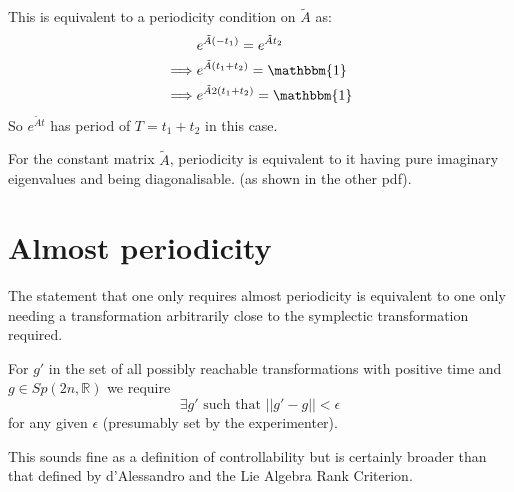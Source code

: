 This is equivalent to a periodicity condition on $\tilde{A}$ as:
\begin{equation}
\begin{aligned}
&e^{\tilde{A}(-t_1)} = e^{\tilde{A}t_2} \\
\implies &e^{\tilde{A}(t_1+t_2)} = \mathbbm{1} \\
\implies &e^{\tilde{A}2(t_1+t_2)} = \mathbbm{1}
\end{aligned}
\end{equation}
So $e^{\tilde{A}t}$ has period of $T = t_1 + t_2$ in this case.

For the constant matrix $\tilde{A}$, periodicity is equivalent to it having pure imaginary eigenvalues and being diagonalisable. (as shown in the other pdf).

\section{Almost periodicity}
The statement that one only requires almost periodicity is equivalent to one only needing a transformation arbitrarily close to the symplectic transformation required.

For $g'$ in the set of all possibly reachable transformations with positive time and $g \in Sp(2n,\mathbb{R})$ we require
\begin{equation}
\exists g' \text{ such that } ||g' - g|| < \epsilon
\end{equation}
for any given $\epsilon$ (presumably set by the experimenter).

This sounds fine as a definition of controllability but is certainly broader than that defined by d'Alessandro and the Lie Algebra Rank Criterion.

